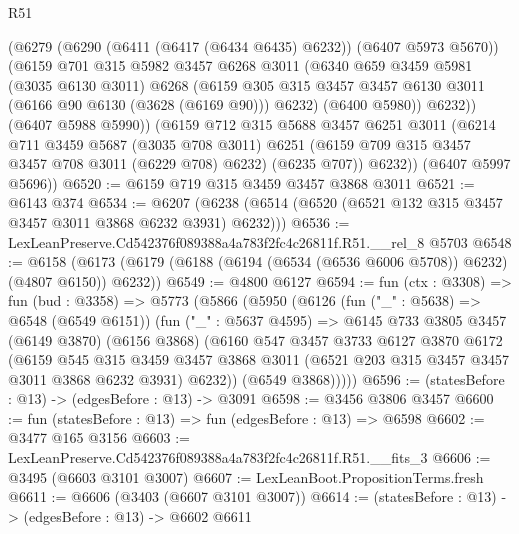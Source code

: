 \begin{lexlean}{R51}
\begin{coremodule}
          (@6279
            (@6290 (@6411 (@6417 (@6434 @6435) @6232)) (@6407 @5973 @5670))
            (@6159
              @701
              @315
              @5982
              @3457
              @6268
              @3011
              (@6340
                @659
                @3459
                @5981
                (@3035 @6130 @3011)
                @6268
                (@6159
                  @305
                  @315
                  @3457
                  @3457
                  @6130
                  @3011
                  (@6166 @90 @6130 (@3628 (@6169 @90)))
                  @6232)
                (@6400 @5980))
              @6232))
          (@6407 @5988 @5990))
        (@6159
          @712
          @315
          @5688
          @3457
          @6251
          @3011
          (@6214
            @711
            @3459
            @5687
            (@3035 @708 @3011)
            @6251
            (@6159 @709 @315 @3457 @3457 @708 @3011 (@6229 @708) @6232)
            (@6235 @707))
          @6232))
      (@6407 @5997 @5696))
@6520 := @6159 @719 @315 @3459 @3457 @3868 @3011
@6521 := @6143 @374
@6534 := @6207 (@6238 (@6514 (@6520 (@6521 @132 @315 @3457 @3457 @3011 @3868 @6232 @3931) @6232)))
@6536 := LexLeanPreserve.Cd542376f089388a4a783f2fc4c26811f.R51.__rel_8 @5703
@6548 := @6158 (@6173 (@6179 (@6188 (@6194 (@6534 (@6536 @6006 @5708)) @6232) (@4807 @6150)) @6232))
@6549 := @4800 @6127
@6594 := fun (ctx : @3308) =>
  fun (bud : @3358) =>
  @5773
    (@5866
      (@5950
        (@6126
          (fun ("_" : @5638) => @6548 (@6549 @6151))
          (fun ("_" : @5637 @4595) =>
          @6145
            @733
            @3805
            @3457
            (@6149 @3870)
            (@6156 @3868)
            (@6160
              @547
              @3457
              @3733
              @6127
              @3870
              @6172
              (@6159
                @545
                @315
                @3459
                @3457
                @3868
                @3011
                (@6521 @203 @315 @3457 @3457 @3011 @3868 @6232 @3931)
                @6232))
            (@6549 @3868)))))
@6596 := (statesBefore : @13) -> (edgesBefore : @13) -> @3091
@6598 := @3456 @3806 @3457
@6600 := fun (statesBefore : @13) => fun (edgesBefore : @13) => @6598
@6602 := @3477 @165 @3156
@6603 := LexLeanPreserve.Cd542376f089388a4a783f2fc4c26811f.R51.__fits_3
@6606 := @3495 (@6603 @3101 @3007)
@6607 := LexLeanBoot.PropositionTerms.fresh
@6611 := @6606 (@3403 (@6607 @3101 @3007))
@6614 := (statesBefore : @13) -> (edgesBefore : @13) -> @6602 @6611

\end{coremodule}
\end{lexlean}
